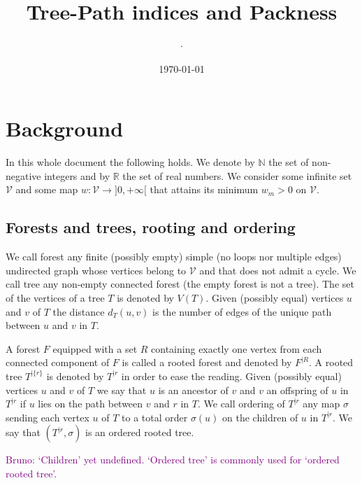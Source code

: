 \documentclass[11 pt]{modarticle}
\title{Tree-Path indices and Packness}
\date{\today}
\author[1]{$\cdot$}
\newcommand{\cN}{\mathbb{N}}
\newcommand{\cR}{\mathbb{R}}
\newcommand{\vset}{\mathcal{V}}
\newcommand{\wmap}{w}
\newcommand{\wmin}{w_m}
\newcommand{\vsetof}[1]{V(#1)}
\newcommand{\distance}[3]{d_{#3}(#1,#2)}
\newcommand{\rtree}[2]{{#1}^{\lvert #2}}
\newcommand{\ortree}[3]{(\rtree{#1}{#2},{#3})}
\newcommand{\bldcomment}[1]{\textcolor{purple}{{\footnotesize Bruno:} #1}}
\begin{document}
\maketitle
\thispagestyle{empty} %

\begin{abstract}
\end{abstract}

\tableofcontents
	
\pagebreak

\section{Background}

In this whole document the following holds. We denote by $\cN$ the set of non-negative integers and by $\cR$ the set of real numbers. We consider some infinite set $\vset$ and some map $\wmap : \vset \to ]0,+\infty[$ that attains its minimum $\wmin > 0$ on $\vset$.

\subsection{Forests and trees, rooting and ordering}

We call forest any finite (possibly empty) simple (no loops nor multiple edges) undirected graph whose vertices belong to $\vset$ and that does not admit a cycle. We call tree any non-empty connected forest (the empty forest is not a tree). The set of the vertices of a tree $T$ is denoted by $\vsetof{T}$. Given (possibly equal) vertices $u$ and $v$ of $T$ the distance $\distance{u}{v}{T}$ is the number of edges of the unique path between $u$ and $v$ in $T$.

A forest $F$ equipped with a set $R$ containing exactly one vertex from each connected component of $F$ is called a rooted forest and denoted by $\rtree{F}{R}$. %
A rooted tree $\rtree{T}{\{r\}}$ is denoted by $\rtree{T}{r}$ in order to ease the reading. Given (possibly equal) vertices $u$ and $v$ of $T$ we say that $u$ is an ancestor of $v$ and $v$ an offspring of $u$ in $\rtree{T}{r}$ if $u$ lies on the path between $v$ and $r$ in $T$. We call ordering of $\rtree{T}{r}$ any map $\sigma$ sending each vertex $u$ of $T$ to a total order $\sigma(u)$ on the children of $u$ in $\rtree{T}{r}$. We say that $\ortree{T}{r}{\sigma}$ is an ordered rooted tree.

\bldcomment{`Children' yet undefined. `Ordered tree' is commonly used for `ordered rooted tree'.}
\end{document}

